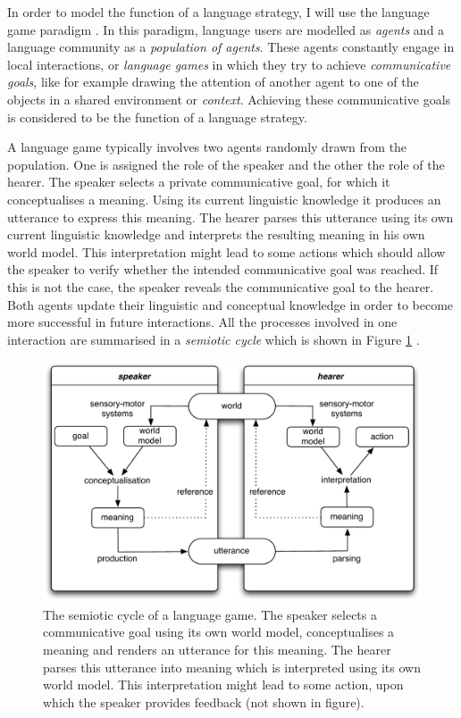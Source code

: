 In order to model the function of a language strategy, I will use the
language game paradigm \citep{steels96self}. In this paradigm,
language users are modelled as \emph{agents} and a language community
as a \emph{population of agents}. These agents constantly engage in
local interactions, or \emph{language games} in
which they try to achieve \emph{communicative
  goals}, like for example drawing the
attention of another agent to one of the objects in a shared
environment or \emph{context}. Achieving these communicative goals is considered to be
the function of a language strategy.

A language game typically involves two agents randomly drawn from the
population. One is assigned the role of the speaker and the other the
role of the hearer. The speaker selects a private communicative goal,
for which it conceptualises a meaning. Using its current linguistic
knowledge it produces an utterance to express this meaning. The hearer
parses this utterance using its own current linguistic knowledge and
interprets the resulting meaning in his own world model. This
interpretation might lead to some actions which should allow the
speaker to verify whether the intended communicative goal was
reached. If this is not the case, the speaker reveals the
communicative goal to the hearer. Both agents update their linguistic
and conceptual knowledge in order to become more successful in future
interactions. All the processes involved in one interaction are
summarised in a \emph{semiotic cycle} which is
shown in Figure \ref{f:intro-semiotic-cycle}
\citep{steels03reentrance}.

\begin{figure}[htbp]
  \begin{center}
   \includegraphics[width=\textwidth]{./intro/figures/semiotic-cycle.pdf}
   \caption[The semiotic cycle of a language game]{The semiotic cycle
     of a language game. The speaker selects a communicative goal
     using its own world model, conceptualises a meaning and renders
     an utterance for this meaning. The hearer parses this utterance
     into meaning which is interpreted using its own world model. This
     interpretation might lead to some action, upon which the speaker
     provides feedback (not shown in figure).}
    \label{f:intro-semiotic-cycle}
  \end{center}
\end{figure}

